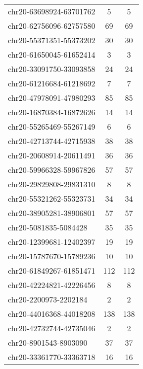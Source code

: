 \begin{longtable}{lSS}
	chr20-63698924-63701762 & 5      & 5                          \\
	chr20-62756096-62757580 & 69     & 69                         \\
	chr20-55371351-55373202 & 30     & 30                         \\
	chr20-61650045-61652414 & 3      & 3                          \\
	chr20-33091750-33093858 & 24     & 24                         \\
	chr20-61216684-61218692 & 7      & 7                          \\
	chr20-47978091-47980293 & 85     & 85                         \\
	chr20-16870384-16872626 & 14     & 14                         \\
	chr20-55265469-55267149 & 6      & 6                          \\
	chr20-42713744-42715938 & 38     & 38                         \\
	chr20-20608914-20611491 & 36     & 36                         \\
	chr20-59966328-59967826 & 57     & 57                         \\
	chr20-29829808-29831310 & 8      & 8                          \\
	chr20-55321262-55323731 & 34     & 34                         \\
	chr20-38905281-38906801 & 57     & 57                         \\
	chr20-5081835-5084428   & 35     & 35                         \\
	chr20-12399681-12402397 & 19     & 19                         \\
	chr20-15787670-15789236 & 10     & 10                         \\
	chr20-61849267-61851471 & 112    & 112                        \\
	chr20-42224821-42226456 & 8      & 8                          \\
	chr20-2200973-2202184   & 2      & 2                          \\
	chr20-44016368-44018208 & 138    & 138                        \\
	chr20-42732744-42735046 & 2      & 2                          \\
	chr20-8901543-8903090   & 37     & 37                         \\
	chr20-33361770-33363718 & 16     & 16                         \\

\end{longtable}
